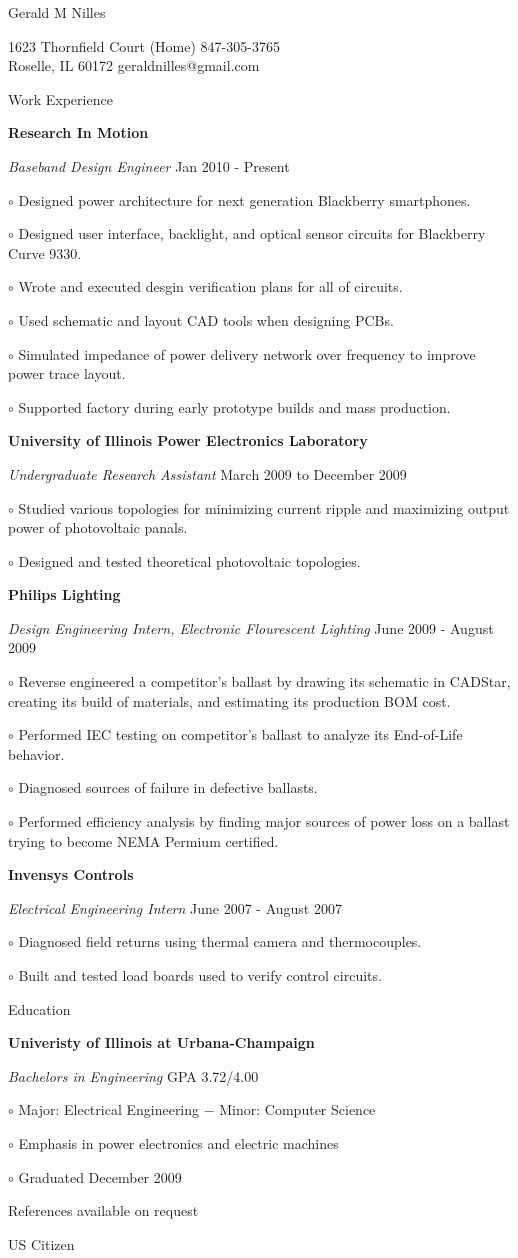 \documentclass[12pt, letterpaper]{article}
\newcommand{\myname}[1]{{\begin{center} \LARGE #1 \end{center} \par}}
\newcommand{\myhead}[1]{{\vspace{1mm} \Large #1 \par}}
\newcommand{\company}[1]{{\vspace{2mm} \addtolength{\leftskip}{10mm} \textbf{#1} \par}}
\newcommand{\position}[2]{{\addtolength{\leftskip}{10mm} \emph{#1} \hfill #2 \par \vspace{1mm}}}
\newcommand{\skill}[1]{{  \addtolength{\leftskip}{20mm} \setlength\parindent{-4mm} $\circ$ #1 \par}}
\begin{document}
\pagestyle{empty}
\raggedright

\myname{Gerald M Nilles}
1623 Thornfield Court  \hfill (Home) 847-305-3765 \\
Roselle, IL 60172   \hfill geraldnilles@gmail.com \\

\myhead{Work Experience}
    \company{Research In Motion}
    \position{Baseband Design Engineer}{Jan 2010 - Present}
        \skill{Designed power architecture for next generation Blackberry smartphones.}
        \skill{Designed user interface, backlight, and optical sensor circuits for Blackberry Curve 9330.}
        \skill{Wrote and executed desgin verification plans for all of circuits.}
        \skill{Used schematic and layout CAD tools when designing PCBs.}
        \skill{Simulated impedance of power delivery network over frequency to improve power trace layout.}
        \skill{Supported factory during early prototype builds and mass production.}

    \company{University of Illinois Power Electronics Laboratory}
    \position{Undergraduate Research Assistant}{March 2009 to December 2009}
        \skill{Studied various topologies for minimizing current ripple and maximizing output power of photovoltaic panals.}
        \skill{Designed and tested theoretical photovoltaic topologies.}

    \company{Philips Lighting} 
    \position{Design Engineering Intern, Electronic Flourescent Lighting}{June 2009 - August 2009}
        \skill{Reverse engineered a competitor's ballast by drawing its schematic in CADStar, creating its build of materials, and estimating its production BOM cost.}
        \skill{Performed IEC testing on competitor's ballast to analyze its End-of-Life behavior.}
        \skill{Diagnosed sources of failure in defective ballasts.}
        \skill{Performed efficiency analysis by finding major sources of power loss on a ballast trying to become NEMA Permium certified.}

    \company{Invensys Controls}
    \position{Electrical Engineering Intern}{June 2007 - August 2007}
        \skill{Diagnosed field returns using thermal camera and thermocouples.}
        \skill{Built and tested load boards used to verify control circuits.}

\myhead{Education}
    \company{Univeristy of Illinois at Urbana-Champaign}
    \position{Bachelors in Engineering}{GPA 3.72/4.00}
        \skill{Major: Electrical Engineering $-$ Minor: Computer Science}
        \skill{Emphasis in power electronics and electric machines}
        \skill{Graduated December 2009}

\begin{center}
References available on request \par
US Citizen \par
\end{center}
\end{document}
